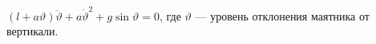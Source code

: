$(l + a \vartheta)\ddot{\vartheta} + a\dot{\vartheta}^2 + g\sin{\vartheta} = 0$,
где $\vartheta$ --- уровень отклонения маятника от вертикали.
